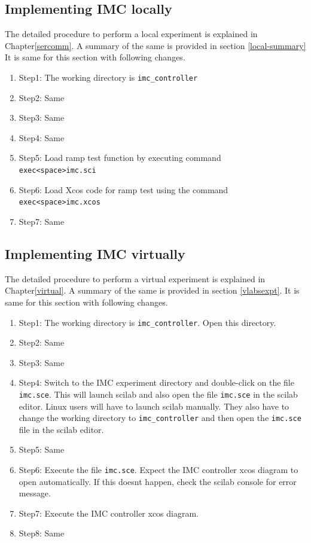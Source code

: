 \subsection{Implementing IMC locally}
The detailed procedure to perform a local experiment is explained in Chapter\ref{sercomm}. A summary of the same is provided in section \ref{local-summary} It is same for this section with following changes.

\begin{enumerate}
\item Step1: The working directory is {\tt  imc\_controller}
\item Step2: Same
\item Step3: Same
\item Step4: Same
\item Step5: Load ramp test function by executing command\\ {\tt exec<space>imc.sci}
\item Step6: Load Xcos code for ramp test using the command\\ {\tt exec<space>imc.xcos}
\item Step7: Same
\end{enumerate}

\subsection{Implementing IMC virtually}

The detailed procedure to perform a virtual experiment is explained in Chapter\ref{virtual}. A summary of the same is provided in section \ref{vlabsexpt}. It is same for this section with following changes.

\begin{enumerate}
\item Step1: The working directory is {\tt  imc\_controller}. Open this directory.
\item Step2: Same
\item Step3: Same
\item Step4:  Switch to the IMC  experiment directory and double-click on the file {\tt imc.sce}. This will launch scilab and also open the file {\tt imc.sce} in the scilab editor. Linux users will have to launch scilab manually. They also have to change the working directory to {\tt imc\_controller} and then open the {\tt  imc.sce} file in the scilab editor.
\item Step5: Same
\item Step6: Execute the file {\tt imc.sce}.  Expect the IMC controller xcos diagram to open automatically. If this doesnt happen, check the scilab console for error message.
\item Step7: Execute the IMC controller xcos diagram.
\item Step8: Same
\end{enumerate}


